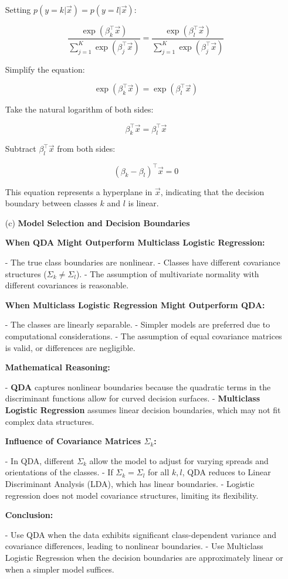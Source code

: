 \documentclass{article}
\begin{document}
\begin{enumerate}
    Setting \( p(y = k | \vec{x}) = p(y = l | \vec{x}) \):
    
    \[
    \frac{\exp(\beta_k^\top \vec{x})}{\sum_{j=1}^K \exp(\beta_j^\top \vec{x})} = \frac{\exp(\beta_l^\top \vec{x})}{\sum_{j=1}^K \exp(\beta_j^\top \vec{x})}
    \]
    
    Simplify the equation:
    
    \[
    \exp(\beta_k^\top \vec{x}) = \exp(\beta_l^\top \vec{x})
    \]
    
    Take the natural logarithm of both sides:
    
    \[
    \beta_k^\top \vec{x} = \beta_l^\top \vec{x}
    \]
    
    Subtract \( \beta_l^\top \vec{x} \) from both sides:
    
    \[
    (\beta_k - \beta_l)^\top \vec{x} = 0
    \]
    
    This equation represents a hyperplane in \( \vec{x} \), indicating that the decision boundary between classes \( k \) and \( l \) is linear.
    
    \item[(c)] \textbf{Model Selection and Decision Boundaries}
    
    \textbf{When QDA Might Outperform Multiclass Logistic Regression:}
    
    - The true class boundaries are nonlinear.
    - Classes have different covariance structures (\( \Sigma_k \neq \Sigma_l \)).
    - The assumption of multivariate normality with different covariances is reasonable.
    
    \textbf{When Multiclass Logistic Regression Might Outperform QDA:}
    
    - The classes are linearly separable.
    - Simpler models are preferred due to computational considerations.
    - The assumption of equal covariance matrices is valid, or differences are negligible.
    
    \textbf{Mathematical Reasoning:}
    
    - \textbf{QDA} captures nonlinear boundaries because the quadratic terms in the discriminant functions allow for curved decision surfaces.
    - \textbf{Multiclass Logistic Regression} assumes linear decision boundaries, which may not fit complex data structures.
    
    \textbf{Influence of Covariance Matrices \( \Sigma_k \):}
    
    - In QDA, different \( \Sigma_k \) allow the model to adjust for varying spreads and orientations of the classes.
    - If \( \Sigma_k = \Sigma_l \) for all \( k, l \), QDA reduces to Linear Discriminant Analysis (LDA), which has linear boundaries.
    - Logistic regression does not model covariance structures, limiting its flexibility.
    
    \textbf{Conclusion:}
    
    - Use QDA when the data exhibits significant class-dependent variance and covariance differences, leading to nonlinear boundaries.
    - Use Multiclass Logistic Regression when the decision boundaries are approximately linear or when a simpler model suffices.
    
\end{enumerate}
\end{document}
